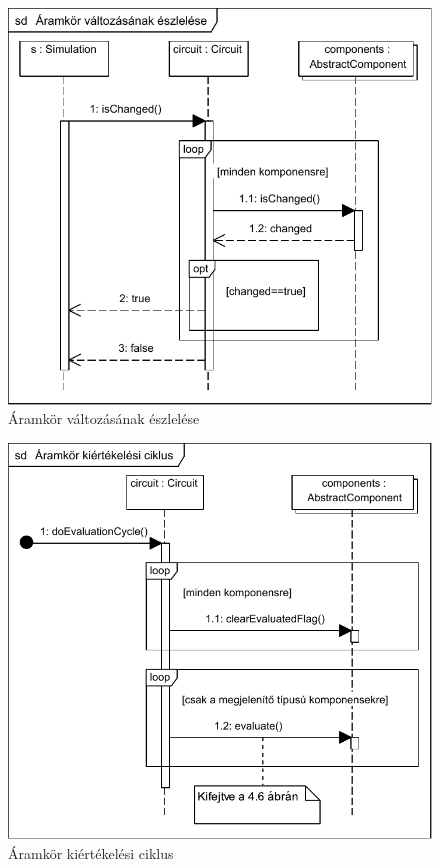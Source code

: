 \begin{figure}[H]
\begin{center}
\includegraphics{chapters/chapter04/seqdiagrams/is_changed.pdf}
\caption{Áramkör változásának észlelése}
\label{fig:is_changed}
\end{center}
\end{figure}

\begin{figure}[H]
\begin{center}
\includegraphics{chapters/chapter04/seqdiagrams/new/doEvalCycle.pdf}
\caption{Áramkör kiértékelési ciklus}
\label{fig:circuit_sim}
\end{center}
\end{figure}

